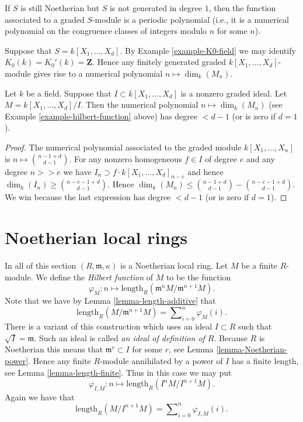 \begin{remark}
If $S$ is still Noetherian but $S$ is not generated in degree $1$,
then the function associated to a graded $S$-module is a periodic
polynomial (i.e., it is a numerical polynomial on the
congruence classes of integers modulo $n$ for some $n$).
\end{remark}

\begin{example}
\label{example-hilbert-function}
Suppose that $S = k[X_1, \ldots, X_d]$.
By Example \ref{example-K0-field} we may identify
$K_0(k) = K_0'(k) = \mathbf{Z}$. Hence any finitely
generated graded $k[X_1, \ldots, X_d]$-module
gives rise to a numerical polynomial
$n \mapsto \dim_k(M_n)$.
\end{example}

\begin{lemma}
\label{lemma-quotient-smaller-d}
Let $k$ be a field. Suppose that $I \subset k[X_1, \ldots, X_d]$
is a nonzero graded ideal. Let $M = k[X_1, \ldots, X_d]/I$.
Then the numerical polynomial $n \mapsto \dim_k(M_n)$ (see
Example \ref{example-hilbert-function} above)
has degree $ < d - 1$ (or is zero if $d = 1$).
\end{lemma}

\begin{proof}
The numerical polynomial associated to the graded module
$k[X_1, \ldots, X_n]$ is $n \mapsto \binom{n - 1 + d}{d - 1}$.
For any nonzero homogeneous $f \in I$ of degree $e$
and any degree $n >> e$ we have $I_n \supset f \cdot k[X_1, \ldots, X_d]_{n-e}$
and hence $\dim_k(I_n) \geq \binom{n - e - 1 + d}{d - 1}$. Hence
$\dim_k(M_n) \leq \binom{n - 1 + d}{d - 1} - \binom{n - e - 1 + d}{d - 1}$.
We win because the last expression
has degree $ < d - 1$ (or is zero if $d = 1$).
\end{proof}








\section{Noetherian local rings}
\label{section-Noetherian-local}

\noindent
In all of this section $(R, \mathfrak m, \kappa)$
is a Noetherian local ring.
Let $M$ be a finite $R$-module. We define the {\it Hilbert
function} of $M$ to be the function
$$
\varphi_M : n
\longmapsto
\text{length}_R(\mathfrak m^nM/{\mathfrak m}^{n + 1}M).
$$
Note that we have by Lemma \ref{lemma-length-additive}
that
$$
\text{length}_R(M / \mathfrak m^{n + 1}M)
=
\sum\nolimits_{i = 0}^n
\varphi_M(i).
$$
There is a variant of this construction which uses an
ideal $I \subset R$ such that $\sqrt{I} = \mathfrak m$.
Such an ideal is called {\it an ideal of definition
of $R$}. Because $R$ is Noetherian this means that
$\mathfrak m^r \subset I$ for some $r$, see Lemma
\ref{lemma-Noetherian-power}. Hence any finite $R$-module
annihilated by a power of $I$ has a finite length, see Lemma
\ref{lemma-length-finite}.
Thus in this case we may put
$$
\varphi_{I, M} : n
\longmapsto
\text{length}_R(I^nM/I^{n + 1}M).
$$
Again we have that
$$
\text{length}_R(M / I^{n + 1}M)
=
\sum\nolimits_{i = 0}^n
\varphi_{I, M}(i).
$$

